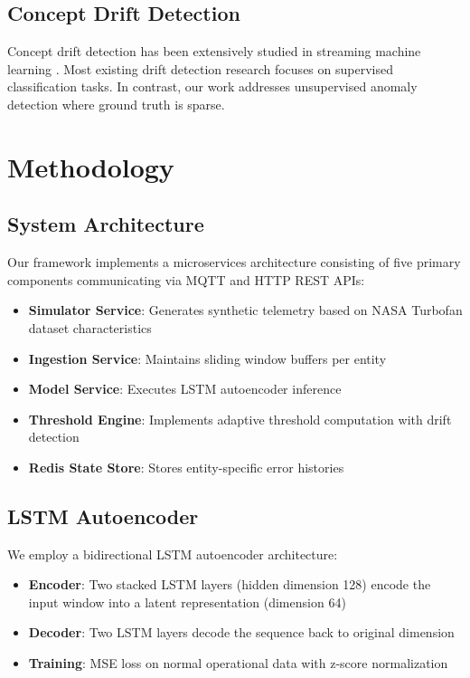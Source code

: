 \documentclass[conference]{IEEEtran}
\begin{document}
\subsection{Concept Drift Detection}

Concept drift detection has been extensively studied in streaming machine learning \cite{gama2014}. Most existing drift detection research focuses on supervised classification tasks. In contrast, our work addresses unsupervised anomaly detection where ground truth is sparse.

\section{Methodology}

\subsection{System Architecture}

Our framework implements a microservices architecture consisting of five primary components communicating via MQTT and HTTP REST APIs:

\begin{itemize}
\item \textbf{Simulator Service}: Generates synthetic telemetry based on NASA Turbofan dataset characteristics
\item \textbf{Ingestion Service}: Maintains sliding window buffers per entity
\item \textbf{Model Service}: Executes LSTM autoencoder inference
\item \textbf{Threshold Engine}: Implements adaptive threshold computation with drift detection
\item \textbf{Redis State Store}: Stores entity-specific error histories
\end{itemize}

\subsection{LSTM Autoencoder}

We employ a bidirectional LSTM autoencoder architecture:

\begin{itemize}
\item \textbf{Encoder}: Two stacked LSTM layers (hidden dimension 128) encode the input window into a latent representation (dimension 64)
\item \textbf{Decoder}: Two LSTM layers decode the sequence back to original dimension
\item \textbf{Training}: MSE loss on normal operational data with z-score normalization
\end{itemize}
\end{document}
